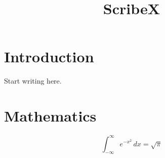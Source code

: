 \documentclass{article}
\title{ScribeX}
\author{}
\date{}
\begin{document}
\maketitle

\section{Introduction}
Start writing here.

\section{Mathematics}
\begin{equation}
  \int_{-\infty}^{\infty} e^{-x^2}\,dx = \sqrt{\pi}
\end{equation}
\end{document}
